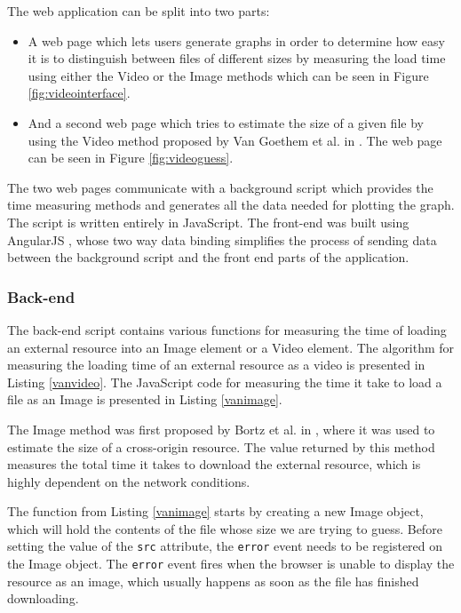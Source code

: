 \documentclass[10pt,a4paper,twoside]{book}
\begin{document}
The web application can be split into two parts:
\begin{itemize}
\item A web page which lets users generate graphs in order to determine how easy it is to distinguish between files of different sizes by measuring the load time using either the Video or the Image methods which can be seen in Figure \ref{fig:videointerface}.
\item And a second web page which tries to estimate the size of a given file by using the Video method proposed by Van Goethem et al. in \cite{van2015clock}. The web page can be seen in Figure \ref{fig:videoguess}.
\end{itemize}

The two web pages communicate with a background script which provides the time measuring methods and generates all the data needed for plotting the graph. The script is written entirely in JavaScript. The front-end was built using AngularJS\cite{angularjs} , whose two way data binding simplifies the process of sending data between the background script and the front end parts of the application.

\subsubsection{Back-end}

The back-end script contains various functions for measuring the time of loading an external resource into an Image element or a Video element. The algorithm for measuring the loading time of an external resource as a video is presented in Listing \ref{vanvideo}. The JavaScript code for measuring the time it take to load a file as an Image is presented in Listing \ref{vanimage}.

The Image method was first proposed by Bortz et al. in \cite{bortz2007exposing}, where it was used to estimate the size of a cross-origin resource. The value returned by this method measures the total time it takes to download the external resource, which is highly dependent on the network conditions. 

The function from Listing \ref{vanimage} starts by creating a new Image object, which will hold the contents of the file whose size we are trying to guess. Before setting the value of the \texttt{src} attribute, the \texttt{error} event needs to be registered on the Image object. The \texttt{error} event fires when the browser is unable to display the resource as an image, which usually happens as soon as the file has finished downloading. 
\end{document}

